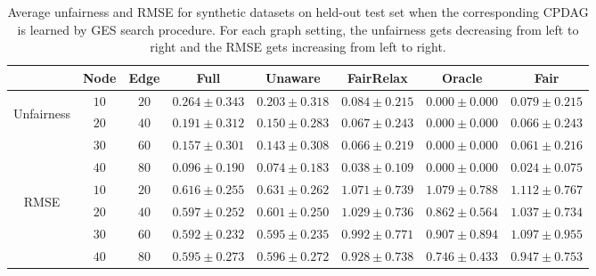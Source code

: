 \documentclass{article}
\begin{document}
\begin{table}[!ht]
\caption{Average unfairness and RMSE for synthetic datasets on held-out test set when the corresponding CPDAG is learned by GES search procedure. For each graph setting, the unfairness gets decreasing from left to right and the RMSE gets increasing from left to right.}
\label{tab: RMSE and Unfairness for simultion data_analyzing method robustness on GES}
\begin{center}
\small
\begin{tabular}{cccccccc}
    \hline
           &Node &Edge   &Full     &Unaware  &FairRelax  &Oracle   &Fair\\ \hline
  \multirow{4}{*}{\begin{turn}{90}Unfairness\end{turn}}  &$10$   &$20$    &$0.264\pm0.343$ &$0.203\pm0.318$  &$0.084\pm0.215$ &$0.000\pm0.000$ &$0.079\pm0.215$ \\ %
            &$20$   &$40$    &$0.191\pm0.312$ &$0.150\pm0.283$ &$0.067\pm0.243$ &$0.000\pm0.000$ &$0.066\pm0.243$ \\ %
            &$30$   &$60$    &$0.157\pm0.301$ &$0.143\pm0.308$ &$0.066\pm0.219$ &$0.000\pm0.000$ &$0.061\pm0.216$ \\ %
            &$40$   &$80$    &$0.096\pm0.190$ &$0.074\pm0.183$ &$0.038\pm0.109$ &$0.000\pm0.000$ &$0.024\pm0.075$ \\ \hline\hline
    
    \multirow{4}{*}{\begin{turn}{90}RMSE\end{turn}}    &$10$   &$20$    &$0.616\pm0.255$   &$0.631\pm0.262$  &$1.071\pm0.739$   &$1.079\pm0.788$    &$1.112\pm0.767$ \\ %
            &$20$   &$40$    &$0.597\pm0.252$   &$0.601\pm0.250$   &$1.029\pm0.736$   &$0.862\pm0.564$    &$1.037\pm0.734$ \\ %
            &$30$   &$60$    &$0.592\pm0.232$    &$0.595\pm0.235$  &$0.992\pm0.771$    &$0.907\pm0.894$   &$1.097\pm0.955$\\ %
            &$40$   &$80$    &$0.595\pm0.273$     &$0.596\pm0.272$ &$0.928\pm0.738$    &$0.746\pm0.433$ &$0.947\pm0.753$ \\ \hline
\end{tabular}
\end{center}
\end{table}
\end{document}
